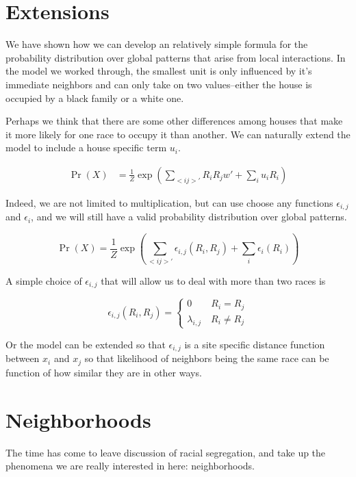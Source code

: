 \documentclass{article}
\begin{document}
\section{Extensions}
We have shown how we can develop an relatively simple formula
for the probability distribution over global patterns that arise from
local interactions. In the model we worked through, the smallest unit
is only influenced by it's immediate neighbors and can only take on
two values--either the house is occupied by a black family or a white
one. 

Perhaps we think that there are some other differences among houses
that make it more likely for one race to occupy it than another.
We can naturally extend the model to include a house specific term $u_i$.

\begin{align}
\Pr(X) &= \frac{1}{Z}\operatorname{exp}(\sum_{<i j>'}R_iR_jw' + \sum_iu_iR_i) 
\end{align}

Indeed, we are not limited to multiplication, but can use choose any
functions $\epsilon_{i,j}$ and $\epsilon_i$, and we will still have a valid 
probability distribution over global patterns.

\begin{equation}
\Pr(X) = \frac{1}{Z}\operatorname{exp}(\sum_{<i j>'}\epsilon_{i,j}(R_i,R_j) + \sum_i\epsilon_i(R_i)) 
\end{equation}

A simple choice of $\epsilon_{i,j}$ that will allow us to deal with
more than two races is

\begin{equation}
\epsilon_{i,j}(R_i,R_j) = \begin{cases}
  0 \quad\quad R_i = R_j \\
  \lambda_{i,j} \quad R_i \neq R_j
\end{cases}
\end{equation}

Or the model can be extended so that $\epsilon_{i,j}$ is a
site specific distance function between $x_i$ and $x_j$ so that
likelihood of neighbors being the same race can be function of how
similar they are in other ways. 

\section{Neighborhoods}
The time has come to leave discussion of racial segregation, and take
up the phenomena we are really interested in here: neighborhoods.
\end{document}
